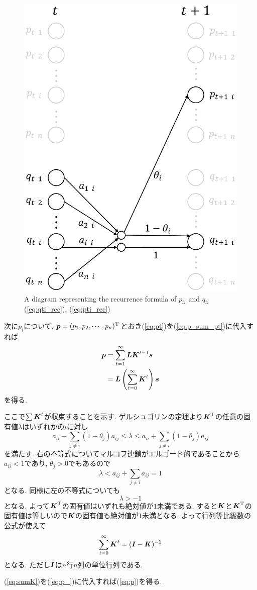 \begin{figure}[bt]
    \centering
    \includegraphics[keepaspectratio, width=0.7\linewidth]{figs/pq.eps}
    \caption{A diagram representing the recurrence formula of $ p_{t i} $ and $ q_{t i} $ (\ref{eq:qti_rec}), (\ref{eq:pti_rec})}
\end{figure}

次に$ p_i $について, $ \boldsymbol{p} = (p_1 , p_2 , \cdots , p_n)^\mathrm{T} $とおき(\ref{eq:pt})を(\ref{eq:p_sum_pt})に代入すれば
\begin{align}
    \boldsymbol{p} &= \sum_{t=1}^{\infty} \boldsymbol{L} \boldsymbol{K}^{t - 1} \boldsymbol{s} \\
    &= \boldsymbol{L} \left( \sum_{t=0}^{\infty} \boldsymbol{K}^t \right) \boldsymbol{s} \label{eq:p_}
\end{align}
を得る. 

ここで$ \sum \boldsymbol{K}^t $が収束することを示す. 
ゲルシュゴリンの定理\cite{s_saito}より$ \boldsymbol{K}^{\mathrm{T}} $の任意の固有値$ \lambda $はいずれかの$ i $に対し
\begin{equation}
    a_{i i} - \sum_{j \ne i}(1 - \theta_j) a_{i j} \le \lambda \le a_{i i} + \sum_{j \ne i}(1 - \theta_j) a_{i j}
\end{equation}
を満たす. 右の不等式についてマルコフ連鎖がエルゴード的であることから$ a_{i i} < 1 $であり, \cite{funaki}$ \theta_j > 0 $でもあるので
\begin{equation}
    \lambda < a_{i j} + \sum_{j \ne i} a_{i j} = 1
\end{equation}
となる. 同様に左の不等式についても
\begin{equation}
    \lambda > -1
\end{equation}
となる. よって$ \boldsymbol{K}^\mathrm{T} $の固有値はいずれも絶対値が$ 1 $未満である. すると$ \boldsymbol{K} $と$ \boldsymbol{K}^{\mathrm{T}} $の固有値は等しいので$ \boldsymbol{K} $の固有値も絶対値が$ 1 $未満となる. 
よって行列等比級数の公式が使えて\cite{m_saito}
\begin{equation} \label{eq:sumK}
    \sum_{t=0}^{\infty} \boldsymbol{K}^t = (\boldsymbol{I} - \boldsymbol{K})^{-1}
\end{equation}
となる. ただし$ \boldsymbol{I} $は$ n $行$ n $列の単位行列である. 

(\ref{eq:sumK})を(\ref{eq:p_})に代入すれば(\ref{eq:p})を得る. 
